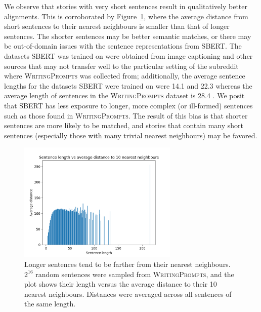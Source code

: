 \documentclass{article}
\begin{document}
We observe that stories with very short sentences result in qualitatively better alignments.
This is corroborated by Figure~\ref{fig:len-v-dist}, where the average distance
from short sentences to their nearest neighbours is smaller than that of longer sentences.
The shorter sentences may be better semantic matches,
or there may be out-of-domain issues with the sentence representations from SBERT.
The datasets SBERT was trained on were obtained from image captioning and other sources
that may not transfer well to the particular setting of the subreddit where
\textsc{WritingPrompts} was collected from;
additionally, the average sentence lengths for the datasets SBERT were trained on were 
14.1 and 22.3 \citep{bowman2015snli,williams2017mnli}
whereas the average length of sentences in the \textsc{WritingPrompts}
dataset is 28.4 \citep{fan2018writingprompts}.
We posit that SBERT has less exposure to longer, more complex (or ill-formed) sentences
such as those found in \textsc{WritingPrompts}.
The result of this bias is that shorter sentences are more likely to be matched,
and stories that contain many short sentences (especially those with many trivial nearest neighbours)
may be favored.
\begin{figure}[h]
\centering
\includegraphics[width=3in]{img/senlen-v-nn-dist.png}
\caption{
\label{fig:len-v-dist}
Longer sentences tend to be farther from their nearest neighbours.
$2^{16}$ random sentences were sampled from \textsc{WritingPrompts},
and the plot shows their length versus the average distance to their 10 nearest neighbours.
Distances were averaged across all sentences of the same length.
}
\end{figure}

\end{document}
